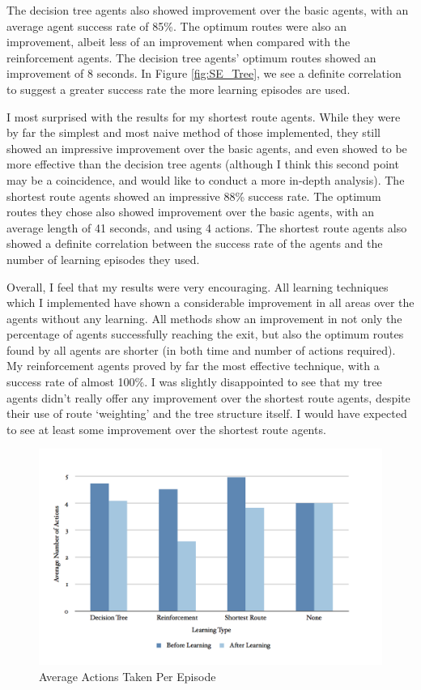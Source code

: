 \documentclass[a4paper,oneside]{report}
\begin{document}
The decision tree agents also showed improvement over the basic agents, with an average agent success rate of 85\%. The optimum routes were also an improvement, albeit less of an improvement when compared with the reinforcement agents. The decision tree agents' optimum routes showed an improvement of 8 seconds. In Figure \ref{fig:SE_Tree}, we see a definite correlation to suggest a greater success rate the more learning episodes are used.

I most surprised with the results for my shortest route agents. While they were by far the simplest and most naive method of those implemented, they still showed an impressive improvement over the basic agents, and even showed to be more effective than the decision tree agents (although I think this second point may be a coincidence, and would like to conduct a more in-depth analysis). The shortest route agents showed an impressive 88\% success rate. The optimum routes they chose also showed improvement over the basic agents, with an average length of 41 seconds, and using 4 actions. The shortest route agents also showed a definite correlation between the success rate of the agents and the number of learning episodes they used.

Overall, I feel that my results were very encouraging. All learning techniques which I implemented have shown a considerable improvement in all areas over the agents without any learning. All methods show an improvement in not only the percentage of agents successfully reaching the exit, but also the optimum routes found by all agents are shorter (in both time and number of actions required). My reinforcement agents proved by far the most effective technique, with a success rate of almost 100\%. I was slightly disappointed to see that my tree agents didn't really offer any improvement over the shortest route agents, despite their use of route `weighting' and the tree structure itself. I would have expected to see at least some improvement over the shortest route agents.
\newpage

\begin{figure}[H]
  \centering
    \includegraphics[width=140mm]{sources/images/AvgActions}
    \caption{Average Actions Taken Per Episode}
    \label{fig:AvgActions}
\end{figure}
\end{document}
